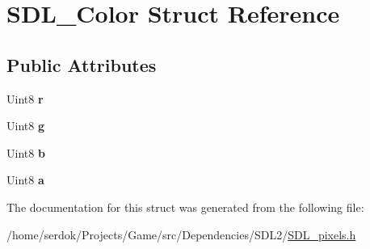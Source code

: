 \hypertarget{structSDL__Color}{}\section{S\+D\+L\+\_\+\+Color Struct Reference}
\label{structSDL__Color}
\subsection*{Public Attributes}
\begin{DoxyCompactItemize}
\item 
\mbox{\label{structSDL__Color_a0bb975b6829524133fdd3c6060cfa63d}} 
Uint8 {\bfseries r}
\item 
\mbox{\label{structSDL__Color_ae29d881bf740cfa7078b36e07f85d298}} 
Uint8 {\bfseries g}
\item 
\mbox{\label{structSDL__Color_a3b79a27e0414049559aa5bcf241dedd3}} 
Uint8 {\bfseries b}
\item 
\mbox{\label{structSDL__Color_ac497ba67af6ecb4d51bdd0945b314526}} 
Uint8 {\bfseries a}
\end{DoxyCompactItemize}


The documentation for this struct was generated from the following file\+:\begin{DoxyCompactItemize}
\item 
/home/serdok/\+Projects/\+Game/src/\+Dependencies/\+S\+D\+L2/\hyperlink{SDL__pixels_8h}{S\+D\+L\+\_\+pixels.\+h}\end{DoxyCompactItemize}
